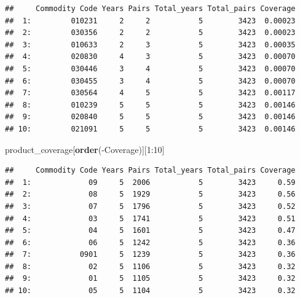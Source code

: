 \documentclass[10pt,]{article}
\newenvironment{Shaded}{\begin{snugshade}}{\end{snugshade}}
\newcommand{\KeywordTok}[1]{\textcolor[rgb]{0.13,0.29,0.53}{\textbf{{#1}}}}
\newcommand{\DecValTok}[1]{\textcolor[rgb]{0.00,0.00,0.81}{{#1}}}
\newcommand{\NormalTok}[1]{{#1}}
\begin{document}
\begin{verbatim}
##     Commodity Code Years Pairs Total_years Total_pairs Coverage
##  1:         010231     2     2           5        3423  0.00023
##  2:         030356     2     2           5        3423  0.00023
##  3:         010633     2     3           5        3423  0.00035
##  4:         020830     4     3           5        3423  0.00070
##  5:         030446     3     4           5        3423  0.00070
##  6:         030455     3     4           5        3423  0.00070
##  7:         030564     4     5           5        3423  0.00117
##  8:         010239     5     5           5        3423  0.00146
##  9:         020840     5     5           5        3423  0.00146
## 10:         021091     5     5           5        3423  0.00146
\end{verbatim}

\begin{Shaded}
\begin{Highlighting}[]
\NormalTok{product_coverage[}\KeywordTok{order}\NormalTok{(-Coverage)][}\DecValTok{1}\NormalTok{:}\DecValTok{10}\NormalTok{]}
\end{Highlighting}
\end{Shaded}

\begin{verbatim}
##     Commodity Code Years Pairs Total_years Total_pairs Coverage
##  1:             09     5  2006           5        3423     0.59
##  2:             08     5  1929           5        3423     0.56
##  3:             07     5  1796           5        3423     0.52
##  4:             03     5  1741           5        3423     0.51
##  5:             04     5  1601           5        3423     0.47
##  6:             06     5  1242           5        3423     0.36
##  7:           0901     5  1239           5        3423     0.36
##  8:             02     5  1106           5        3423     0.32
##  9:             01     5  1105           5        3423     0.32
## 10:             05     5  1104           5        3423     0.32
\end{verbatim}
\end{document}
